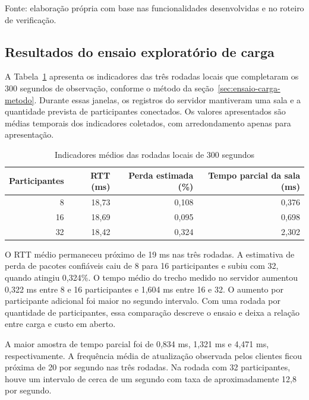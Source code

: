 Fonte: elaboração própria com base nas funcionalidades desenvolvidas e no roteiro de verificação.

\subsection{Resultados do ensaio exploratório de carga}\label{sec:ensaio-carga-resultados}

A Tabela~\ref{tab:carga-local} apresenta os indicadores das três rodadas locais que completaram os 300 segundos de observação, conforme o método da seção~\ref{sec:ensaio-carga-metodo}. Durante essas janelas, os registros do servidor mantiveram uma sala e a quantidade prevista de participantes conectados. Os valores apresentados são médias temporais dos indicadores coletados, com arredondamento apenas para apresentação.

\begin{table}[htbp]
\centering
\caption{Indicadores médios das rodadas locais de 300 segundos}
\label{tab:carga-local}
\begingroup
\small
\setlength{\tabcolsep}{5pt}
\renewcommand{\arraystretch}{1.18}
\begin{tabular}{rrrr}
\toprule
Participantes & RTT (ms) & Perda estimada (\%) & Tempo parcial da sala (ms) \\
\midrule
8 & 18,73 & 0,108 & 0,376 \\
16 & 18,69 & 0,095 & 0,698 \\
32 & 18,42 & 0,324 & 2,302 \\
\bottomrule
\end{tabular}
\endgroup
{}
\end{table}

O RTT médio permaneceu próximo de 19 ms nas três rodadas. A estimativa de perda de pacotes confiáveis caiu de 8 para 16 participantes e subiu com 32, quando atingiu 0,324\%. O tempo médio do trecho medido no servidor aumentou 0,322 ms entre 8 e 16 participantes e 1,604 ms entre 16 e 32. O aumento por participante adicional foi maior no segundo intervalo. Com uma rodada por quantidade de participantes, essa comparação descreve o ensaio e deixa a relação entre carga e custo em aberto.

A maior amostra de tempo parcial foi de 0,834 ms, 1,321 ms e 4,471 ms, respectivamente. A frequência média de atualização observada pelos clientes ficou próxima de 20 por segundo nas três rodadas. Na rodada com 32 participantes, houve um intervalo de cerca de um segundo com taxa de aproximadamente 12,8 por segundo.

